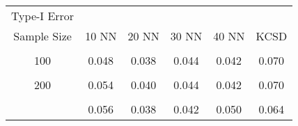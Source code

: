 \begin{table}[!h]
\centering\begingroup\fontsize{5}{7}\selectfont

\begin{tabular}{cccccc}
\toprule
\multicolumn{1}{c}{Type-I Error} \\
\cmidrule(l{3pt}r{3pt}){1-1}
Sample Size &  10 NN & 20 NN & 30 NN & 40 NN & KCSD\\
\midrule
\cellcolor{gray!6}{50} & \cellcolor{gray!6}{0.058} & \cellcolor{gray!6}{0.062} & \cellcolor{gray!6}{0.048} & \cellcolor{gray!6}{0.044} & \cellcolor{gray!6}{0.068}\\
100 & 0.048 & 0.038 & 0.044 & 0.042 & 0.070\\
\cellcolor{gray!6}{150} & \cellcolor{gray!6}{0.050} & \cellcolor{gray!6}{0.048} & \cellcolor{gray!6}{0.042} & \cellcolor{gray!6}{0.058} & \cellcolor{gray!6}{0.098}\\
200 & 0.054 & 0.040 & 0.044 & 0.042 & 0.070\\
\cellcolor{gray!6}{250} & \cellcolor{gray!6}{0.050} & \cellcolor{gray!6}{0.040} & \cellcolor{gray!6}{0.052} & \cellcolor{gray!6}{0.054} & \cellcolor{gray!6}{0.088}\\
\addlinespace
300 & 0.056 & 0.038 & 0.042 & 0.050 & 0.064\\
\bottomrule
\end{tabular}
\endgroup{}
\end{table}

